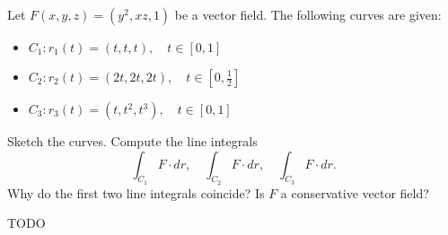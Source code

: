\begin{exercise}
	Let $ F(x,y,z) = (y^2, xz, 1) $ be a vector field. The following curves are given:
	\begin{itemize}
		\item $ C_1: r_1(t) = (t, t, t), \quad t \in [0,1] $
		\item $ C_2: r_2(t) = (2t, 2t, 2t), \quad t \in [0, \frac{1}{2}] $
		\item $ C_3: r_3(t) = (t, t^2, t^3), \quad t \in [0,1] $
	\end{itemize}
	Sketch the curves. Compute the line integrals
	$$
		\int_{C_1} F \cdot dr, \quad \int_{C_2} F \cdot dr, \quad \int_{C_3} F \cdot dr.
	$$
	Why do the first two line integrals coincide? Is $F$ a conservative vector field?
\end{exercise}

\begin{solution}
	TODO
\end{solution}
